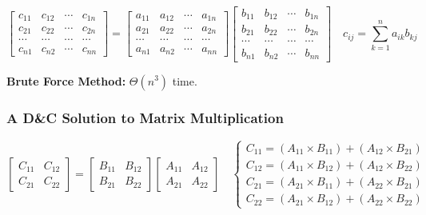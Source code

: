 \documentclass[10pt]{article}
\begin{document}
$$
\left[
\begin{matrix}
	c_{11} & c_{12} & \cdots & c_{1n}\\
	c_{21} & c_{22} & \cdots & c_{2n}\\
	\cdots & \cdots & \cdots & \cdots\\
	c_{n1} & c_{n2} & \cdots & c_{nn}
\end{matrix}
\right]
=
\left[
\begin{matrix}
	a_{11} & a_{12} & \cdots & a_{1n}\\
	a_{21} & a_{22} & \cdots & a_{2n}\\
	\cdots & \cdots & \cdots & \cdots\\
	a_{n1} & a_{n2} & \cdots & a_{nn}
\end{matrix}
\right]
\left[
\begin{matrix}
	b_{11} & b_{12} & \cdots & b_{1n}\\
	b_{21} & b_{22} & \cdots & b_{2n}\\
	\cdots & \cdots & \cdots & \cdots\\
	b_{n1} & b_{n2} & \cdots & b_{nn}
\end{matrix}
\right]\quad
c_{ij} = \sum_{k=1}^n a_{ik} b_{kj}
$$

\textbf{Brute Force Method:} $\Theta (n^3)$ time.

\subsubsection{A D\&C Solution to Matrix Multiplication}

$$
\left[
\begin{matrix}
	C_{11} & C_{12}\\
	C_{21} & C_{22}
\end{matrix}
\right]
=
\left[
\begin{matrix}
	B_{11} & B_{12}\\
	B_{21} & B_{22}
\end{matrix}
\right]
\left[
\begin{matrix}
	A_{11} & A_{12}\\
	A_{21} & A_{22}
\end{matrix}
\right]\quad
\begin{cases}
	C_{11} = (A_{11}\times B_{11}) + (A_{12}\times B_{21})\\
	C_{12} = (A_{11}\times B_{12}) + (A_{12}\times B_{22})\\
	C_{21} = (A_{21}\times B_{11}) + (A_{22}\times B_{21})\\
	C_{22} = (A_{21}\times B_{12}) + (A_{22}\times B_{22})
\end{cases}
$$
\end{document}

